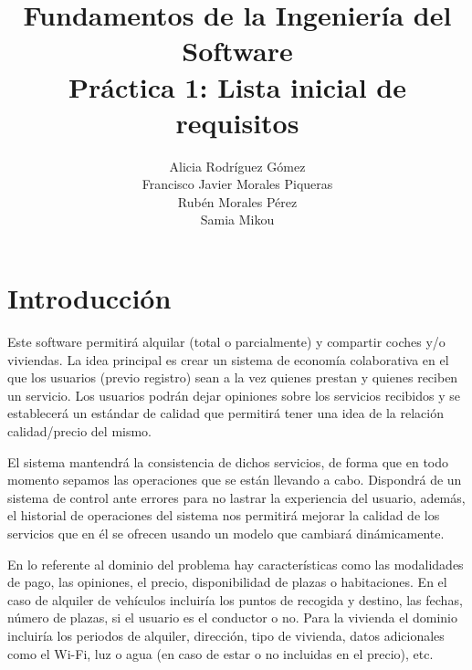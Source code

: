 \documentclass[11pt,spanish]{article} %
\begin{document}
\title{Fundamentos de la Ingeniería del Software \\  Práctica 1: Lista inicial de requisitos}
\author{
	\begin{tabular}{rl} 	
		Alicia Rodríguez Gómez \\
		Francisco Javier Morales Piqueras\\ 
		Rubén Morales Pérez\\ 
		Samia Mikou \\ 
	\end{tabular}
}
\date{ }

\maketitle
\tableofcontents %
\newpage
\setlength\parindent{0pt} %

  
\section{Introducción}
\hspace{0.5cm}Este software permitirá alquilar (total o parcialmente) y compartir coches y/o viviendas.
La idea principal es crear un sistema de economía colaborativa en el que los usuarios (previo registro) sean a la vez quienes prestan y quienes reciben un servicio.
Los usuarios podrán dejar opiniones sobre los servicios recibidos y se establecerá un estándar de calidad que permitirá tener una idea de la relación calidad/precio del mismo.

\hspace{0.5cm}El sistema mantendrá la consistencia de dichos servicios, de forma que en todo momento sepamos las operaciones que se están llevando a cabo.
Dispondrá de un sistema de control ante errores para no lastrar la experiencia del usuario, además, el historial de operaciones del sistema nos permitirá mejorar la calidad de los servicios que en él se ofrecen usando un modelo que cambiará dinámicamente.

\hspace{0.5cm}En lo referente al dominio del problema hay características como las modalidades de pago, las opiniones, el precio, disponibilidad de plazas o habitaciones.
En el caso de alquiler de vehículos incluiría los puntos de recogida y destino, las fechas, número de plazas, si el usuario es el conductor o no.
Para la vivienda el dominio incluiría los periodos de alquiler, dirección, tipo de vivienda, datos adicionales como el Wi-Fi, luz o agua (en caso de estar o no incluidas en el precio), etc.
\end{document}
